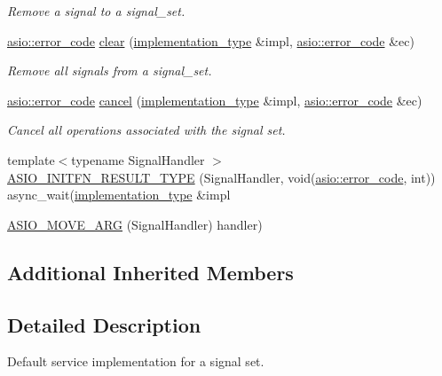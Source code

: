 \begin{DoxyCompactItemize}
\begin{DoxyCompactList}\small\item\em Remove a signal to a signal\+\_\+set. \end{DoxyCompactList}\item 
\hyperlink{classasio_1_1error__code}{asio\+::error\+\_\+code} \hyperlink{classasio_1_1signal__set__service_ae6ba477ca22f9d0e1b70f82d8720b4bd}{clear} (\hyperlink{classasio_1_1signal__set__service_a15c9b1c4bf96f3491eb2e8e30b5a483a}{implementation\+\_\+type} \&impl, \hyperlink{classasio_1_1error__code}{asio\+::error\+\_\+code} \&ec)
\begin{DoxyCompactList}\small\item\em Remove all signals from a signal\+\_\+set. \end{DoxyCompactList}\item 
\hyperlink{classasio_1_1error__code}{asio\+::error\+\_\+code} \hyperlink{classasio_1_1signal__set__service_a5b798a6bdb9283829297c333d8f4e0f1}{cancel} (\hyperlink{classasio_1_1signal__set__service_a15c9b1c4bf96f3491eb2e8e30b5a483a}{implementation\+\_\+type} \&impl, \hyperlink{classasio_1_1error__code}{asio\+::error\+\_\+code} \&ec)
\begin{DoxyCompactList}\small\item\em Cancel all operations associated with the signal set. \end{DoxyCompactList}\item 
{\footnotesize template$<$typename Signal\+Handler $>$ }\\\hyperlink{classasio_1_1signal__set__service_afae49d77d5884c4b1fe342523d3d8028}{A\+S\+I\+O\+\_\+\+I\+N\+I\+T\+F\+N\+\_\+\+R\+E\+S\+U\+L\+T\+\_\+\+T\+Y\+P\+E} (Signal\+Handler, void(\hyperlink{classasio_1_1error__code}{asio\+::error\+\_\+code}, int)) async\+\_\+wait(\hyperlink{classasio_1_1signal__set__service_a15c9b1c4bf96f3491eb2e8e30b5a483a}{implementation\+\_\+type} \&impl
\item 
\hyperlink{classasio_1_1signal__set__service_abae2962620383b109d85178e141f0994}{A\+S\+I\+O\+\_\+\+M\+O\+V\+E\+\_\+\+A\+R\+G} (Signal\+Handler) handler)
\end{DoxyCompactItemize}
\subsection*{Additional Inherited Members}


\subsection{Detailed Description}
Default service implementation for a signal set. 

